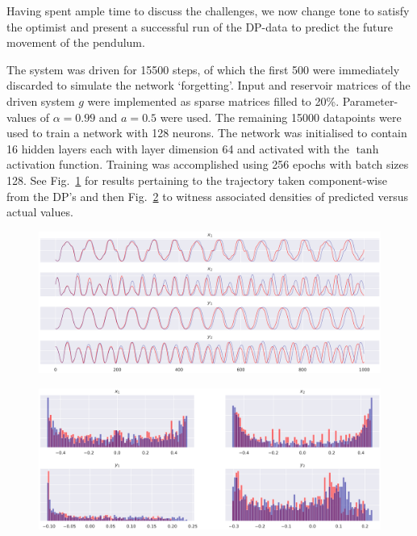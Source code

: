 Having spent ample time to discuss the challenges, we now change tone to satisfy the optimist and present a successful run of the DP-data to predict the future movement of the pendulum.

The system was driven for 15500 steps, of which the first 500 were immediately discarded to simulate the network `forgetting'. 
Input and reservoir matrices of the driven system $g$ were implemented as sparse matrices filled to 20\%. Parameter-values of $\alpha=0.99$ and $a=0.5$ were used.
The remaining 15000 datapoints were used to train a network with 128 neurons. 
The network was initialised to contain 16 hidden layers each with layer dimension 64 and activated with the $\tanh$ activation function.
Training was accomplished using 256 epochs with batch sizes 128. See Fig.~\ref{fig:dp_success_traj} for results pertaining to the trajectory taken component-wise from the DP's and then Fig.~\ref{fig:dp_success_density} to witness associated densities of predicted versus actual values.

\begin{figure}[ht]
  \centering
  \includegraphics[width=\linewidth]{Graphs/_dp_success_4coords_traj.eps} 
  \label{fig:dp_success_traj}
\end{figure}
\begin{figure}[ht]
  \centering
  \includegraphics[width=\linewidth]{Graphs/_dp_success_4coords_hist.eps}
  \label{fig:dp_success_density}
 \end{figure}
  

